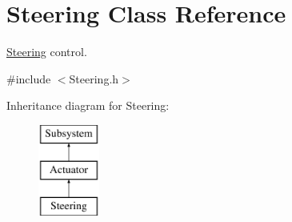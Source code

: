 \hypertarget{classSteering}{\section{Steering Class Reference}
\label{classSteering}
}


\hyperlink{classSteering}{Steering} control.  




{\ttfamily \#include $<$Steering.\-h$>$}

Inheritance diagram for Steering\-:\begin{figure}[H]
\begin{center}
\leavevmode
\includegraphics[height=3.000000cm]{classSteering}
\end{center}
\end{figure}
